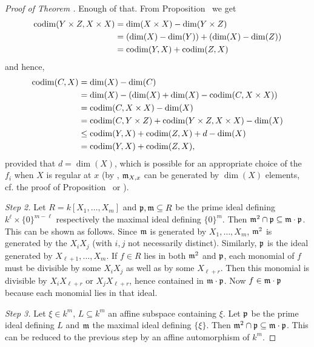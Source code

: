 \documentclass[a4paper,parskip=half,numbers=enddot, DIV=12, headheight=30pt]{scrreprt}
\begin{document}
\begin{proof}[Proof of Theorem ]
    Enough of that. From Proposition~ we get
    \begin{align*}
    	\operatorname{codim}(Y\times Z,X\times X)&=\dim(X\times X)-\dim(Y\times Z)\\
    	&=(\dim (X)-\dim (Y))+(\dim (X)-\dim (Z))\\
    	&=\operatorname{codim}(Y,X)+\operatorname{codim}(Z,X)
    \end{align*}
    and hence, 
    \begin{align*}
        \operatorname{codim}(C,X)& = \dim(X) -\dim(C)\\
        &= \dim (X) - (\dim(X)+\dim(X) -\operatorname{codim}(C,X\times X))\\
        &= \operatorname{codim}(C,X\times X) -\dim (X)\\
        &=\operatorname{codim}(C,Y\times Z)+\operatorname{codim}(Y\times Z,X\times X)-\dim (X)\\
        &\leq \operatorname{codim}(Y,X) +\operatorname{codim}(Z,X) +d-\dim(X) \\
        &=\operatorname{codim}(Y,X) +\operatorname{codim}(Z,X),
    \end{align*}
    provided that $d=\dim(X)$, which is possible for an appropriate choice of the $f_i$ when $X$ is regular at $x$ (by \NAK, $\mathfrak{m}_{X,x}$ can be generated by $\dim (X)$ elements, cf. the proof of Proposition~ or \cite[Concluding remarks, Lemma~1]{alg1}).
    
    \emph{Step 2.} Let $R= k[X_1,\ldots, X_m]$ and $\mathfrak{p},\mathfrak{m}\subseteq R$ be the prime ideal defining $k^\ell \times \{0\}^{m-\ell}$ respectively the maximal ideal defining $\{0\}^m$. Then $\mathfrak{m}^2 \cap \mathfrak{p} \subseteq \mathfrak{m}\cdot\mathfrak{p}$. This can be shown as follows. Since $\mathfrak{m}$ is generated by $X_1,\ldots,X_m$, $\mathfrak{m}^2$ is generated by the $X_iX_j$ (with $i,j$ not necessarily distinct). Similarly, $\mathfrak{p}$ is the ideal generated by $X_{\ell+1},\ldots, X_m$. If $f\in R$ lies in both $\mathfrak{m}^2$ and $\mathfrak{p}$, each monomial of $f$ must be divisible by some $X_iX_j$ as well as by some $X_{\ell+r}$. Then this monomial is divisible by $X_iX_{\ell+r}$ or $X_jX_{\ell+r}$, hence contained in $\mathfrak{m}\cdot\mathfrak{p}$. Now $f\in\mathfrak{m}\cdot\mathfrak{p}$ because each monomial lies in that ideal.
       
   \emph{Step 3.} Let $\xi\in k^m$, $L\subseteq k^m$ an affine subspace containing $\xi$. Let $\mathfrak{p}$ be the prime ideal defining $L$ and $\mathfrak{m}$ the maximal ideal defining $\{\xi\}$. Then $\mathfrak{m}^2 \cap\mathfrak{p} \subseteq \mathfrak{m}\cdot \mathfrak{p}$. This can be reduced to the previous step by an affine automorphism of $k^m$.
    

\end{proof}
\end{document}
